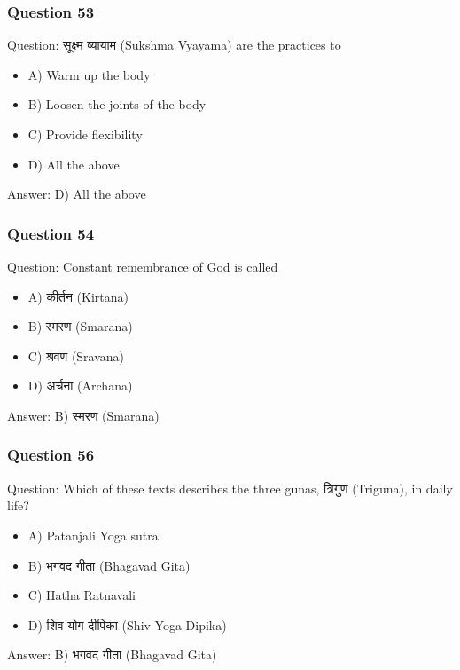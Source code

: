 \begin{frame}[fragile]\frametitle{Question 53}
Question: सूक्ष्म व्यायाम (Sukshma Vyayama) are the practices to
\begin{itemize}
\item A) Warm up the body
\item B) Loosen the joints of the body
\item C) Provide flexibility
\item D) All the above
\end{itemize}
Answer: D) All the above
\end{frame}

\begin{frame}[fragile]\frametitle{Question 54}
Question: Constant remembrance of God is called
\begin{itemize}
\item A) कीर्तन (Kirtana)
\item B) स्मरण (Smarana)
\item C) श्रवण (Sravana)
\item D) अर्चना (Archana)
\end{itemize}
Answer: B) स्मरण (Smarana)
\end{frame}


\begin{frame}[fragile]\frametitle{Question 56}
Question: Which of these texts describes the three gunas, त्रिगुण (Triguna), in daily life?
\begin{itemize}
\item A) Patanjali Yoga sutra
\item B) भगवद गीता (Bhagavad Gita)
\item C) Hatha Ratnavali
\item D) शिव योग दीपिका (Shiv Yoga Dipika)
\end{itemize}
Answer: B) भगवद गीता (Bhagavad Gita)
\end{frame}

